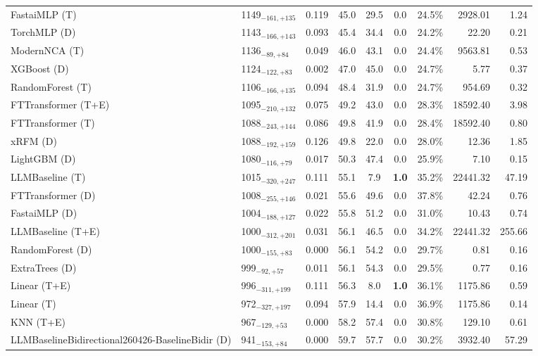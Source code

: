 \begin{tabular}{llcccccrr}
FastaiMLP (T) & 1149${}_{-161,+135}$ & 0.119 & 45.0 & 29.5 & 0.0 & 24.5\% & 2928.01 & 1.24 \\
TorchMLP (D) & 1143${}_{-166,+143}$ & 0.093 & 45.4 & 34.4 & 0.0 & 24.2\% & 22.20 & 0.21 \\
ModernNCA (T) & 1136${}_{-89,+84}$ & 0.049 & 46.0 & 43.1 & 0.0 & 24.4\% & 9563.81 & 0.53 \\
XGBoost (D) & 1124${}_{-122,+83}$ & 0.002 & 47.0 & 45.0 & 0.0 & 24.7\% & 5.77 & 0.37 \\
RandomForest (T) & 1106${}_{-166,+135}$ & 0.094 & 48.4 & 31.9 & 0.0 & 24.7\% & 954.69 & 0.32 \\
FTTransformer (T+E) & 1095${}_{-210,+132}$ & 0.075 & 49.2 & 43.0 & 0.0 & 28.3\% & 18592.40 & 3.98 \\
FTTransformer (T) & 1088${}_{-243,+144}$ & 0.086 & 49.8 & 41.9 & 0.0 & 28.4\% & 18592.40 & 0.80 \\
xRFM (D) & 1088${}_{-192,+159}$ & 0.126 & 49.8 & 22.0 & 0.0 & 28.0\% & 12.36 & 1.85 \\
LightGBM (D) & 1080${}_{-116,+79}$ & 0.017 & 50.3 & 47.4 & 0.0 & 25.9\% & 7.10 & 0.15 \\
LLMBaseline (T) & 1015${}_{-320,+247}$ & 0.111 & 55.1 & 7.9 & \textcolor{bronze}{\textbf{1.0}} & 35.2\% & 22441.32 & 47.19 \\
FTTransformer (D) & 1008${}_{-255,+146}$ & 0.021 & 55.6 & 49.6 & 0.0 & 37.8\% & 42.24 & 0.76 \\
FastaiMLP (D) & 1004${}_{-188,+127}$ & 0.022 & 55.8 & 51.2 & 0.0 & 31.0\% & 10.43 & 0.74 \\
LLMBaseline (T+E) & 1000${}_{-312,+201}$ & 0.031 & 56.1 & 46.5 & 0.0 & 34.2\% & 22441.32 & 255.66 \\
RandomForest (D) & 1000${}_{-155,+83}$ & 0.000 & 56.1 & 54.2 & 0.0 & 29.7\% & 0.81 & 0.16 \\
ExtraTrees (D) & 999${}_{-92,+57}$ & 0.011 & 56.1 & 54.3 & 0.0 & 29.5\% & 0.77 & 0.16 \\
Linear (T+E) & 996${}_{-311,+199}$ & 0.111 & 56.3 & 8.0 & \textcolor{bronze}{\textbf{1.0}} & 36.1\% & 1175.86 & 0.59 \\
Linear (T) & 972${}_{-327,+197}$ & 0.094 & 57.9 & 14.4 & 0.0 & 36.9\% & 1175.86 & 0.14 \\
KNN (T+E) & 967${}_{-129,+53}$ & 0.000 & 58.2 & 57.4 & 0.0 & 30.8\% & 129.10 & 0.61 \\
LLMBaselineBidirectional260426-BaselineBidir (D) & 941${}_{-153,+84}$ & 0.000 & 59.7 & 57.7 & 0.0 & 30.2\% & 3932.40 & 57.29 \\

\end{tabular}
